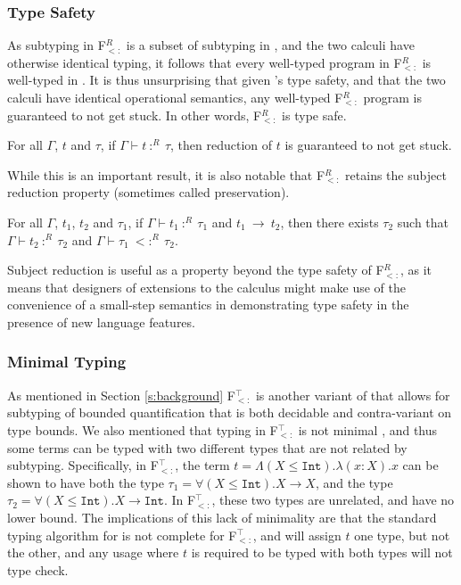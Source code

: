 \documentclass[runningheads]{llncs}
\begin{document}
\subsubsection{Type Safety}
As subtyping in F$_{<:}^R$ is a subset of subtyping in \Fsub, and the two calculi have otherwise identical 
typing, it follows that every well-typed program in F$_{<:}^R$ is well-typed in \Fsub. It is thus unsurprising 
that given \Fsub's type safety, and that the two calculi have identical operational semantics, any well-typed 
F$_{<:}^R$ program is guaranteed to not get stuck. In other words, F$_{<:}^R$ is type safe. 
\begin{theorem}
For all $\Gamma$, $t$ and $\tau$, if $\Gamma \vdash t\ :^R\ \tau$, then reduction of $t$ is guaranteed to 
not get stuck.
\end{theorem}
While this is an important result, it is also notable 
that F$_{<:}^R$ retains the subject reduction property \cite{A Syntactic Approach to Type Soundness} 
(sometimes called preservation).
\begin{theorem}
For all $\Gamma$, $t_1$, $t_2$ and $\tau_1$, if $\Gamma \vdash t_1\ :^R\ \tau_1$ and $t_1\ \longrightarrow\ t_2$,
then there exists $\tau_2$ such that $\Gamma \vdash t_2\ :^R\ \tau_2$ and $\Gamma \vdash \tau_1\ <:^R\ \tau_2$.
\end{theorem}
Subject reduction is useful as a property beyond the type safety of F$_{<:}^R$, as it means that designers of 
extensions to the calculus might make use of the convenience of a small-step semantics in demonstrating 
type safety in the presence of new language features.


\subsubsection{Minimal Typing}

As mentioned in Section \ref{s:background} F$_{<:}^\top$ \cite{castagna} is another variant of \Fsub that allows for 
subtyping of bounded quantification that is both decidable and contra-variant on type bounds. We also mentioned 
that typing in F$_{<:}^\top$ is not minimal \cite{corrigendum}, and thus some terms can be typed with two different types that are not
related by subtyping. Specifically, in F$_{<:}^\top$, the term $t = \Lambda (X \leqslant \texttt{Int}).\lambda(x : X).x$
can be shown to have both the type $\tau_1 = \forall(X \leqslant \texttt{Int}).X \rightarrow X$, and the type
$\tau_2 = \forall(X \leqslant \texttt{Int}).X \rightarrow \texttt{Int}$. In F$_{<:}^\top$, these two types are unrelated, and have 
no lower bound. The implications of this lack of minimality are that the standard typing  algorithm for \Fsub is not complete
for F$_{<:}^\top$, and will assign $t$ one type, but not the other, and any usage where $t$ is required to be typed with
both types will not type check.
\end{document}
